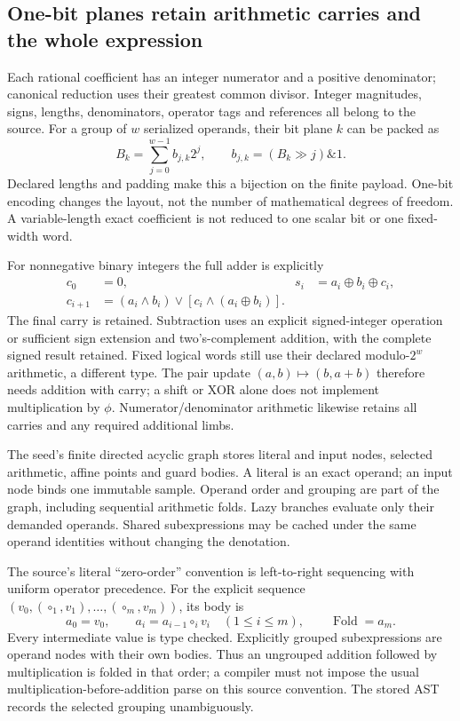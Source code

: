 \subsection{One-bit planes retain arithmetic carries and the whole expression}
Each rational coefficient has an integer numerator and a positive denominator;
canonical reduction uses their greatest common divisor. Integer magnitudes,
signs, lengths, denominators, operator tags and references all belong to the
source. For a group of $w$ serialized operands, their bit plane $k$ can be
packed as
\begin{equation}
 B_k=\sum_{j=0}^{w-1}b_{j,k}2^j,\qquad
 b_{j,k}=(B_k\mathbin{\gg}j)\mathbin{\&}1.
 \label{eq:r15-bitplanes}
\end{equation}
Declared lengths and padding make this a bijection on the finite payload.
One-bit encoding changes the layout, not the number of mathematical degrees
of freedom. A variable-length exact coefficient is not reduced to one scalar
bit or one fixed-width word.

For nonnegative binary integers the full adder is explicitly
\begin{align}
 c_0&=0,&s_i&=a_i\oplus b_i\oplus c_i,\nonumber\\
 c_{i+1}&=(a_i\land b_i)\lor[c_i\land(a_i\oplus b_i)].
 \label{eq:r15-carry}
\end{align}
The final carry is retained. Subtraction uses an explicit signed-integer
operation or sufficient sign extension and two's-complement addition, with
the complete signed result retained. Fixed logical words still use their
declared modulo-$2^w$ arithmetic, a different type. The pair update
$(a,b)\mapsto(b,a+b)$ therefore needs addition with carry; a shift or XOR alone
does not implement multiplication by $\phi$. Numerator/denominator arithmetic
likewise retains all carries and any required additional limbs.

The seed's finite directed acyclic graph stores literal and input nodes,
selected arithmetic, affine points and guard bodies. A literal is an exact
operand; an input node binds one immutable sample. Operand order and grouping
are part of the graph, including sequential arithmetic folds. Lazy branches
evaluate only their demanded operands. Shared subexpressions may be cached
under the same operand identities without changing the denotation.

The source's literal ``zero-order'' convention is left-to-right sequencing
with uniform operator precedence. For the explicit sequence
$(v_0,(\circ_1,v_1),\ldots,(\circ_m,v_m))$, its body is
\begin{equation}
 a_0=v_0,\qquad a_i=a_{i-1}\circ_i v_i\quad(1\le i\le m),
 \qquad \operatorname{Fold}=a_m.
 \label{eq:r15-sequential-fold}
\end{equation}
Every intermediate value is type checked. Explicitly grouped subexpressions
are operand nodes with their own bodies. Thus an ungrouped addition followed
by multiplication is folded in that order; a compiler must not impose the
usual multiplication-before-addition parse on this source convention. The
stored AST records the selected grouping unambiguously.

